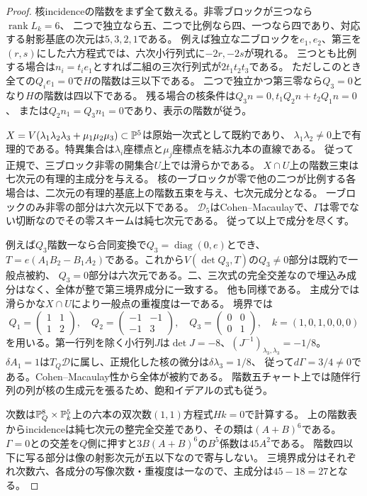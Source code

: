 \begin{proof}
核incidenceの階数をまず全て数える。非零ブロックが三つなら$\operatorname{rank}L_k=6$、
二つで独立なら五、二つで比例なら四、一つなら四であり、対応する射影基底の次元は$5,3,2,1$である。
例えば独立な二ブロックを$e_1,e_2$、第三を$(r,s)$にした六方程式では、六次小行列式に$-2r,-2s$が現れる。
三つとも比例する場合は$n_i=t_ie_1$とすれば二組の三次行列式が$2t_1t_2t_3$である。
ただしこのとき全ての$Q_i e_1=0$で$H$の階数は三以下である。
二つで独立かつ第三零なら$Q_3=0$となり$H$の階数は四以下である。
残る場合の核条件は$Q_3n=0,t_1Q_2n+t_2Q_1n=0$、
または$Q_2n_1=Q_3n_1=0$であり、表示の階数が従う。

$X=V(\lambda_1\lambda_2\lambda_3+\mu_1\mu_2\mu_3)\subset\mathbb P^5$は原始一次式として既約であり、
$\lambda_1\lambda_2\ne0$上で有理的である。特異集合は$\lambda_i$座標点と$\mu_j$座標点を結ぶ九本の直線である。
従って正規で、三ブロック非零の開集合$U$上では滑らかである。
$X\cap U$上の階数三束は七次元の有理的主成分を与える。
核の一ブロックが零で他の二つが比例する各場合は、二次元の有理的基底上の階数五束を与え、七次元成分となる。
一ブロックのみ非零の部分は六次元以下である。
$\mathcal D_5$はCohen--Macaulayで、$\Gamma$は零でない切断なのでその零スキームは純七次元である。
従って以上で成分を尽くす。

例えば$Q_3$階数一なら合同変換で$Q_3=\operatorname{diag}(0,e)$とでき、
$T=e(A_1B_2-B_1A_2)$である。これから$V(\det Q_3,T)$の$Q_3\ne0$部分は既約で一般点被約、
$Q_3=0$部分は六次元である。二、三次式の完全交差なので埋込み成分はなく、全体が整で第三境界成分に一致する。
他も同様である。
主成分では滑らかな$X\cap U$により一般点の重複度は一である。
境界では
\[
 Q_1=\begin{pmatrix}1&1\\1&2\end{pmatrix},\quad
 Q_2=\begin{pmatrix}-1&-1\\-1&3\end{pmatrix},\quad
 Q_3=\begin{pmatrix}0&0\\0&1\end{pmatrix},\quad k=(1,0,1,0,0,0)
\]
を用いる。第一行列を除く小行列$J$は$\det J=-8$、$(J^{-1})_{\lambda_3,\lambda_3}=-1/8$。
$\delta A_1=1$は$T_Q\mathcal D$に属し、正規化した核の微分は$\delta\lambda_3=1/8$、
従って$d\Gamma=3/4\ne0$である。Cohen--Macaulay性から全体が被約である。
階数五チャート上では随伴行列の列が核の生成元を張るため、飽和イデアルの式も従う。

次数は$\mathbb P^8_Q\times\mathbb P^5_k$上の六本の双次数$(1,1)$方程式$Hk=0$で計算する。
上の階数表からincidenceは純七次元の整完全交差であり、その類は$(A+B)^6$である。
$\Gamma=0$との交差を$Q$側に押すと$3B(A+B)^6$の$B^5$係数は$45A^2$である。
階数四以下に写る部分は像の射影次元が五以下なので寄与しない。
三境界成分はそれぞれ次数六、各成分の写像次数・重複度は一なので、主成分は$45-18=27$となる。
\end{proof}

